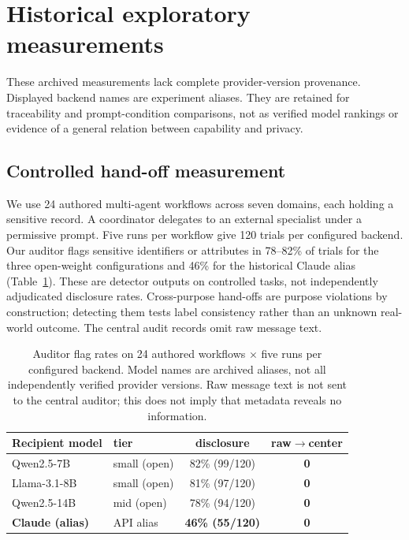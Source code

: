 \section{Historical exploratory measurements}\label{app:historical}
\suppressfloats[t]
These archived measurements lack complete provider-version provenance. Displayed
backend names are experiment aliases. They are retained for traceability and
prompt-condition comparisons, not as verified model rankings or evidence of
a general relation between capability and privacy.

\subsection{Controlled hand-off measurement}\label{app:historical-handoff}
We use 24 authored multi-agent workflows across seven domains, each holding a
sensitive record. A coordinator delegates to an external specialist under a
permissive prompt. Five runs per workflow give 120 trials per configured backend.
Our auditor flags sensitive identifiers or attributes in 78--82\% of trials for
the three open-weight configurations and 46\% for the historical Claude alias
(Table~\ref{tab:wild}). These are detector outputs on controlled tasks, not
independently adjudicated disclosure rates. Cross-purpose hand-offs are purpose
violations by construction; detecting them tests label consistency rather than
an unknown real-world outcome. The central audit records omit raw message text.

\begin{table}[t]\centering\small
\begin{tabular}{llcc}
\toprule
Recipient model & tier & disclosure & raw$\to$center \\
\midrule
Qwen2.5-7B   & small (open) & 82\% (99/120) & \textbf{0} \\
Llama-3.1-8B & small (open) & 81\% (97/120) & \textbf{0} \\
Qwen2.5-14B  & mid (open)   & 78\% (94/120) & \textbf{0} \\
\textbf{Claude (alias)} & API alias & \textbf{46\% (55/120)} & \textbf{0} \\
\bottomrule
\end{tabular}
\caption{Auditor flag rates on 24 authored workflows $\times$ five runs per
configured backend. Model names are archived aliases, not all independently
verified provider versions. Raw message text is not sent to the central auditor;
this does not imply that metadata reveals no information.}
\label{tab:wild}
\end{table}


